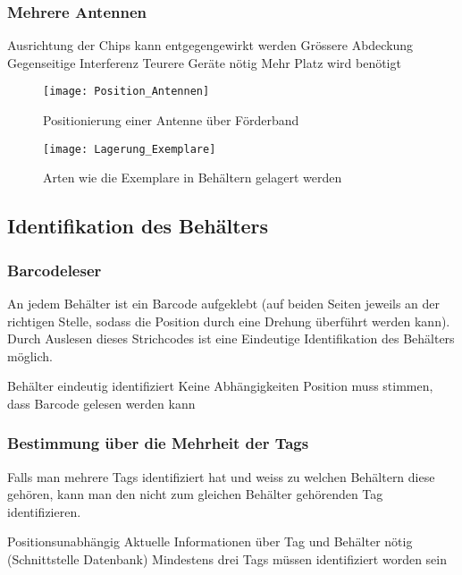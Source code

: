 \subsubsection{Mehrere Antennen}
\begin{itemize}
	\pro Ausrichtung der Chips kann entgegengewirkt werden
	\pro Grössere Abdeckung
	\con Gegenseitige Interferenz
	\con Teurere Geräte nötig
	\con Mehr Platz wird benötigt
\end{itemize}

\begin{figure}[htb]
	\centering
	\texttt{[image: Position\_Antennen]}
	\caption{Positionierung einer Antenne über Förderband}
	\label{fig:PosAntennen}
\end{figure}

\begin{figure}[htb]
	\centering
	\texttt{[image: Lagerung\_Exemplare]}
	\caption{Arten wie die Exemplare in Behältern gelagert werden}
	\label{fig:LagExemplare}
\end{figure}

\subsection{Identifikation des Behälters}

\subsubsection{Barcodeleser}
An jedem Behälter ist ein Barcode aufgeklebt (auf beiden Seiten jeweils an der richtigen Stelle, sodass die Position durch eine Drehung überführt werden kann). Durch Auslesen dieses Strichcodes ist eine Eindeutige Identifikation des Behälters möglich.
\begin{itemize}
	\pro Behälter eindeutig identifiziert
	\pro Keine Abhängigkeiten
	\con Position muss stimmen, dass Barcode gelesen werden kann
\end{itemize}

\subsubsection{Bestimmung über die Mehrheit der Tags}
Falls man mehrere Tags identifiziert hat und weiss zu welchen Behältern diese gehören, kann man den nicht zum gleichen Behälter gehörenden Tag identifizieren.
\begin{itemize}
	\pro Positionsunabhängig
	\con Aktuelle Informationen über Tag und Behälter nötig (Schnittstelle Datenbank)
	\con Mindestens drei Tags müssen identifiziert worden sein
\end{itemize}

